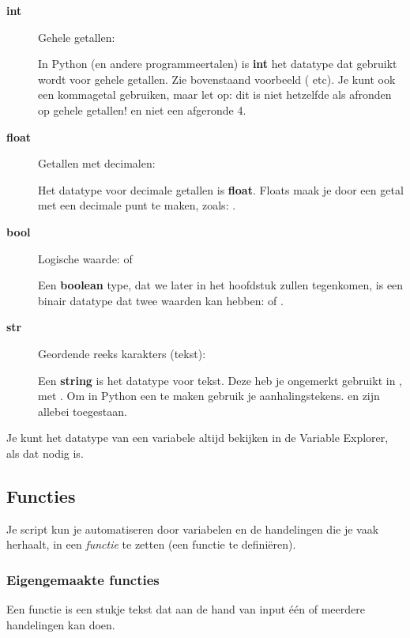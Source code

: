 \documentclass[a4paper,11pt, fleqn]{article}
\begin{document}
\begin{description}
\item[\textbf{int}] Gehele getallen: 

In Python (en andere programmeertalen) is {\bf int} het datatype dat gebruikt wordt voor gehele getallen. Zie bovenstaand voorbeeld ( etc). Je kunt ook een kommagetal gebruiken, maar let op: dit is niet hetzelfde als afronden op gehele getallen!  en niet een afgeronde 4.

\item[\textbf{float}] Getallen met decimalen: 

Het datatype voor decimale getallen is {\bf float}. Floats maak je door een getal met een decimale punt te maken, zoals: .

\item[\textbf{bool}] Logische waarde:  of 

Een {\bf boolean} type, dat we later in het hoofdstuk zullen tegenkomen, is een binair datatype dat twee waarden kan hebben:  of .

\item[\textbf{str}] Geordende reeks karakters (tekst): 

Een {\bf string} is het datatype voor tekst. Deze heb je ongemerkt gebruikt in , met . Om in Python een  te maken gebruik je aanhalingstekens.  en  zijn allebei toegestaan.

\end{description}

Je kunt het datatype van een variabele altijd bekijken in de Variable Explorer, als dat nodig is.

\subsection{Functies}
Je script kun je automatiseren door variabelen en de handelingen die je vaak herhaalt, in een \textit{functie} te zetten (een functie te defini\"eren).

\subsubsection{Eigengemaakte functies}
Een functie is een stukje tekst dat aan de hand van input \'e\'en of meerdere handelingen kan doen.
\end{document}
